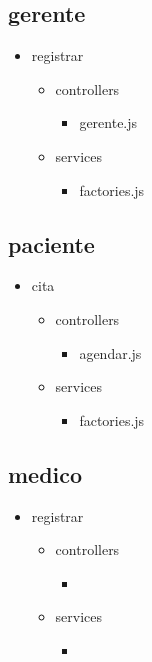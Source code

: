 	\subsection{gerente}
		\begin{itemize}
		\item registrar
		\begin{itemize}
			\item controllers
			\begin{itemize}
				\item gerente.js
			\end{itemize}
			\item services
			\begin{itemize}
				\item factories.js
			\end{itemize}
		\end{itemize}
	\end{itemize}
	\subsection{paciente}
		\begin{itemize}
		\item cita
		\begin{itemize}
			\item controllers
			\begin{itemize}
				\item agendar.js
			\end{itemize}
			\item services
			\begin{itemize}
				\item factories.js
			\end{itemize}
		\end{itemize}
	\end{itemize}
	\subsection{medico}
		\begin{itemize}
		\item registrar
		\begin{itemize}
			\item controllers
			\begin{itemize}
				\item
			\end{itemize}
			\item services
			\begin{itemize}
				\item
			\end{itemize}
		\end{itemize}
	\end{itemize}

